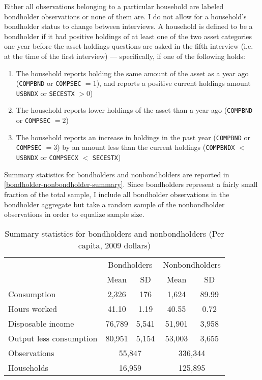 Either all observations belonging to a particular household are labeled bondholder observations or none of them are. I do not allow for a household's bondholder status to change between interviews. A household is defined to be a bondholder if it had positive holdings of at least one of the two asset categories one year before the asset holdings questions are asked in the fifth interview (i.e. at the time of the first interview) --- specifically, if one of the following holds:
\begin{enumerate}
\item The household reports holding the same amount of the asset as a year ago (\texttt{COMPBND} or \texttt{COMPSEC} $= 1$), and reports a positive current holdings amount \texttt{USBNDX} or \texttt{SECESTX} $> 0$)
\item The household reports lower holdings of the asset than a year ago (\texttt{COMPBND} or \texttt{COMPSEC} $= 2$)
\item The household reports an increase in holdings in the past year (\texttt{COMPBND} or \texttt{COMPSEC} $= 3$) by an amount less than the current holdings (\texttt{COMPBNDX} $<$ \texttt{USBNDX} or \texttt{COMPSECX} $<$ \texttt{SECESTX})
\end{enumerate}

Summary statistics for bondholders and nonbondholders are reported in \autoref{bondholder-nonbondholder-summary}. Since bondholders represent a fairly small fraction of the total sample, I include all bondholder observations in the bondholder aggregate but take a random sample of the nonbondholder observations in order to equalize sample size.

\begin{table}[h]
\centering
\caption{Summary statistics for bondholders and nonbondholders (Per capita, 2009 dollars)}
\label{bondholder-nonbondholder-summary}
\begin{tabular}{lcccc} \hline
& \multicolumn{2}{c}{Bondholders} & \multicolumn{2}{c}{Nonbondholders} \\
& Mean & SD & Mean & SD \\ \hline
Consumption             & 2,326  & 176   & 1,624  & 89.99 \\
Hours worked            & 41.10  & 1.19  & 40.55  & 0.72 \\
Disposable income       & 76,789 & 5,541 & 51,901 & 3,958 \\
Output less consumption & 80,951 & 5,154 & 53,003 & 3,655 \\ \hline
Observations            & \multicolumn{2}{c}{55,847} & \multicolumn{2}{c}{336,344} \\
Households              & \multicolumn{2}{c}{16,959} & \multicolumn{2}{c}{125,895} \\ \hline
\end{tabular}
\end{table}